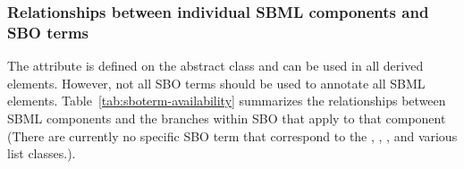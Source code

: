 \subsubsection{Relationships between individual SBML components and SBO terms}

The  attribute is defined on the abstract
  class \SBase and can be used in all derived elements.  However,
not all SBO terms should be used to annotate all
  SBML elements.  Table~\ref{tab:sboterm-availability} summarizes
the relationships between SBML components and the branches within
SBO that apply to that component (There are currently
  no specific SBO term that correspond to the \Sbml,
  \UnitDefinition, \Unit, and various
   list classes.).

\begin{blockChanged}


\end{blockChanged}
